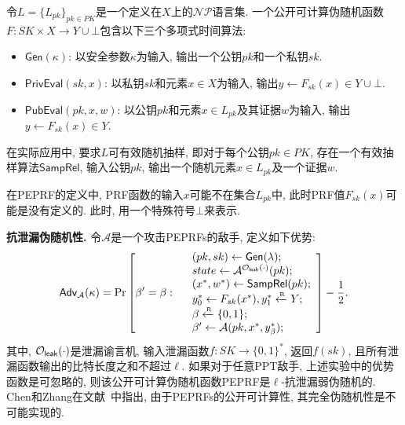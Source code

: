 \begin{definition}[公开可计算伪随机函数]
令$L = \{L_{pk}\}_{pk \in PK}$是一个定义在$X$上的$\mathcal{NP}$语言集. 一个公开可计算伪随机函数$F: SK \times X \rightarrow Y \cup \bot$包含以下三个多项式时间算法:
\begin{itemize} \itemsep 1pt \parskip 0pt \parsep 0pt
\item $\mathsf{Gen}(\kappa)$: 以安全参数$\kappa$为输入, 输出一个公钥$pk$和一个私钥$sk$. 

\item $\mathsf{PrivEval}(sk, x)$: 以私钥$sk$和元素$x \in X$为输入, 输出$y \leftarrow F_{sk}(x) \in Y \cup \bot$. 

\item $\mathsf{PubEval}(pk, x, w)$: 以公钥$pk$和元素$x \in L_{pk}$及其证据$w$为输入, 输出$y \leftarrow F_{sk}(x) \in Y$. 
\end{itemize}
在实际应用中, 要求$L$可有效随机抽样, 即对于每个公钥$pk \in PK$, 存在一个有效抽样算法$\mathsf{SampRel}$, 输入公钥$pk$, 输出一个随机元素$x \in L_{pk}$及一个证据$w$.
\end{definition}

在PEPRF的定义中, PRF函数的输入$x$可能不在集合$L_{pk}$中, 此时PRF值$F_{sk}(x)$可能是没有定义的. 此时, 用一个特殊符号$\bot$来表示. 

\begin{trivlist}
\item \textbf{抗泄漏伪随机性.} 令$\mathcal{A}$是一个攻击PEPRFs的敌手, 定义如下优势:
\begin{displaymath}
    \mathsf{Adv}_\mathcal{A}(\kappa) =
        \Pr \left[ \beta' = \beta: 
            \begin{array}{ll}
                & (pk, sk) \leftarrow \mathsf{Gen}(\lambda);\\
                & state \leftarrow \mathcal{A}^{\mathcal{O}_\mathsf{leak}(\cdot)}(pk);\\
                & (x^*, w^*) \leftarrow \mathsf{SampRel}(pk); \\
                & y_0^* \leftarrow F_{sk}(x^*), y_1^* \xleftarrow{\textup{\tiny R}} Y;\\
                & \beta \xleftarrow{\textup{\tiny R}} \{0,1\};\\ 
                & \beta' \leftarrow \mathcal{A}(pk, x^*, y_\beta^*);
            \end{array} 
            \right]  - \frac{1}{2}.
    \end{displaymath}
其中, $\mathcal{O}_\mathsf{leak}(\cdot)$是泄漏谕言机, 输入泄漏函数$f: SK \rightarrow \{0,1\}^*$, 返回$f(sk)$, 且所有泄漏函数输出的比特长度之和不超过$\ell$. 如果对于任意PPT敌手, 上述实验中的优势函数是可忽略的, 则该公开可计算伪随机函数PEPRF是$\ell$-抗泄漏弱伪随机的. Chen和Zhang在文献~\cite{Chen-SCN-2014}中指出, 由于PEPRFs的公开可计算性, 其完全伪随机性是不可能实现的.     
\end{trivlist} 

